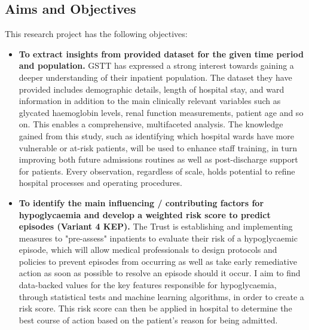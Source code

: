 \subsection{Aims and Objectives} 
This research project has the following objectives:

\begin{itemize}
	\item \textbf{To extract insights from provided dataset for the given time period and population.} GSTT has expressed a strong interest towards gaining a deeper understanding of their inpatient population. The dataset they have provided includes demographic details, length of hospital stay, and ward information in addition to the main clinically relevant variables such as glycated haemoglobin levels, renal function measurements, patient age and so on. This enables a comprehensive, multifaceted analysis. The knowledge gained from this study, such as identifying which hospital wards have more vulnerable or at-risk patients, will be used to enhance staff training, in turn improving both future admissions routines as well as post-discharge support for patients. Every observation, regardless of scale, holds potential to refine hospital processes and operating procedures.
	\item \textbf{To identify the main influencing / contributing factors for hypoglycaemia and develop a weighted risk score to predict episodes (Variant 4 KEP).} The Trust is establishing and implementing measures to "pre-assess" inpatients to evaluate their risk of a hypoglycaemic episode, which will allow medical professionals to design protocols and policies to prevent episodes from occurring as well as take early remediative action as soon as possible to resolve an episode should it occur. I aim to find data-backed values for the key features responsible for hypoglycaemia, through statistical tests and machine learning algorithms, in order to create a risk score. This risk score can then be applied in hospital to determine the best course of action based on the patient's reason for being admitted. 
\end{itemize}

